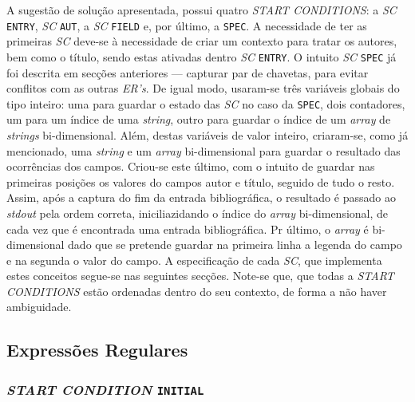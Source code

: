 A sugestão de solução apresentada, possui quatro \emph{START CONDITIONS}:
a \emph{SC} \texttt{ENTRY}, \emph{SC} \texttt{AUT}, a \emph{SC} \texttt{FIELD}
e, por último, a \texttt{SPEC}. A necessidade de ter as primeiras \emph{SC}
deve-se à necessidade de criar um contexto para tratar os autores, bem como
o título, sendo estas ativadas dentro \emph{SC} \texttt{ENTRY}. O intuito
\emph{SC} \texttt{SPEC} já foi descrita em secções anteriores --- capturar par
de chavetas, para evitar conflitos com as outras \emph{ER's}. De igual modo,
usaram-se três variáveis globais do tipo inteiro: uma para guardar o estado das
\emph{SC} no caso da \texttt{SPEC}, dois contadores, um para um índice de uma
\emph{string}, outro para guardar o índice de um \emph{array} de \emph{strings}
bi-dimensional. Além, destas variáveis de valor inteiro, criaram-se, como já
mencionado, uma \emph{string} e um \emph{array} bi-dimensional para guardar
o resultado das ocorrências dos campos. Criou-se este último, com o intuito de
guardar nas primeiras posições os valores do campos autor e título, seguido de
tudo o resto. Assim, após a captura do fim da entrada bibliográfica, o resultado
é passado ao \emph{stdout} pela ordem correta, iniciliazidando o índice do
\emph{array} bi-dimensional, de cada vez que é encontrada uma entrada
bibliográfica. Pr último, o \emph{array} é bi-dimensional dado que se pretende
guardar na primeira linha a legenda do campo e na segunda o valor do campo.
A especificação de cada \emph{SC}, que implementa estes conceitos segue-se nas
seguintes secções. Note-se que, que todas a \emph{START CONDITIONS} estão
ordenadas dentro do seu contexto, de  forma a não haver ambiguidade.

\subsection{Expressões Regulares}


\subsubsection{\emph{START CONDITION} \texttt{INITIAL}}

